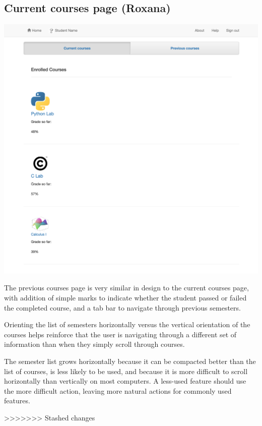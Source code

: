 \subsection{Current courses page (Roxana)}

\includegraphics[width=\textwidth]{screenshots/CurrentCourses.png}

The previous courses page is very similar in design to the current courses page, with addition of simple marks to indicate whether the student passed or failed the completed course, and a tab bar to navigate through previous semesters.

Orienting the list of semesters horizontally versus the vertical orientation of the courses helps reinforce that the user is navigating through a different set of information than when they simply scroll through courses.

The semester list grows horizontally because it can be compacted better than the list of courses, is less likely to be used, and because it is more difficult to scroll horizontally than vertically on most computers. A less-used feature should use the more difficult action, leaving more natural actions for commonly used features.


>>>>>>> Stashed changes
